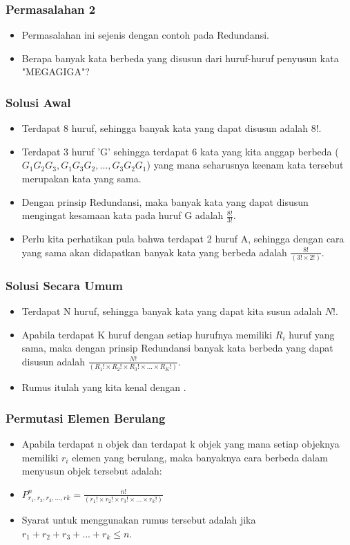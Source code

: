 \begin{frame}
\frametitle{Permasalahan 2}
\begin{itemize}
  \item Permasalahan ini sejenis dengan contoh pada Redundansi.
  \item Berapa banyak kata berbeda yang disusun dari huruf-huruf penyusun kata "MEGAGIGA"?
\end{itemize}
\end{frame}

\begin{frame}
\frametitle{Solusi Awal}
\begin{itemize}
  \item Terdapat 8 huruf, sehingga banyak kata yang dapat disusun adalah $8!$.
  \item Terdapat 3 huruf 'G' sehingga terdapat 6 kata yang kita anggap berbeda ($G_{1}G_{2}G_{3}, G_{1}G_{3}G_{2}, ...,G_{3}G_{2}G_{1}$) yang mana seharusnya keenam kata tersebut merupakan kata yang sama.
  \item Dengan prinsip Redundansi, maka banyak kata yang dapat disusun mengingat kesamaan kata pada huruf G adalah $\frac{8!}{3!}$.
  \item Perlu kita perhatikan pula bahwa terdapat 2 huruf A, sehingga dengan cara yang sama akan didapatkan banyak kata yang berbeda adalah $\frac{8!}{(3! \times 2!)}$.
\end{itemize}
\end{frame}

\begin{frame}
\frametitle{Solusi Secara Umum}
\begin{itemize}
  \item Terdapat N huruf, sehingga banyak kata yang dapat kita susun adalah $N!$.
  \item Apabila terdapat K huruf dengan setiap hurufnya memiliki $R_{i}$ huruf yang sama, maka dengan prinsip Redundansi banyak kata berbeda yang dapat disusun adalah $\frac{N!}{(R_{1}! \times R_{2}! \times R_{3}! \times ... \times R_{K}!)}$.
  \item Rumus itulah yang kita kenal dengan .
\end{itemize}
\end{frame}

\begin{frame}
\frametitle{Permutasi Elemen Berulang}
\begin{itemize}
  \item Apabila terdapat n objek dan terdapat k objek yang mana setiap objeknya memiliki $r_{i}$ elemen yang berulang, maka banyaknya cara berbeda dalam menyusun objek tersebut adalah:
  \item $P^{n}_{r_{1},r_{2},r_{3},...,r{k}} = \frac{n!}{(r_{1}! \times r_{2}! \times r_{3}! \times ... \times r_{k}!)}$ 
  \item Syarat untuk menggunakan rumus tersebut adalah jika $r_{1} + r_{2} + r_{3} + ... + r_{k} \leq n$.
\end{itemize}
\end{frame}

